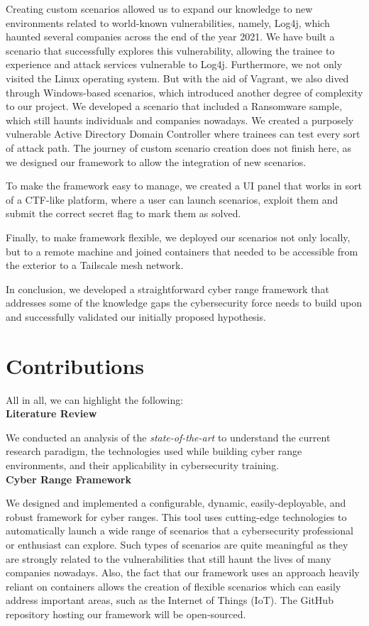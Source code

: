 Creating custom scenarios allowed us to expand our knowledge to new environments related to world-known vulnerabilities, namely, Log4j, which haunted several companies across the end of the year 2021. We have built a scenario that successfully explores this vulnerability, allowing the trainee to experience and attack services vulnerable to Log4j. Furthermore, we not only visited the Linux operating system. But with the aid of Vagrant, we also dived through Windows-based scenarios, which introduced another degree of complexity to our project. We developed a scenario that included a Ransomware sample, which still haunts individuals and companies nowadays. We created a purposely vulnerable Active Directory Domain Controller where trainees can test every sort of attack path. The journey of custom scenario creation does not finish here, as we designed our framework to allow the integration of new scenarios. 

To make the framework easy to manage, we created a UI panel that works in sort of a CTF-like platform, where a user can launch scenarios, exploit them and submit the correct secret flag to mark them as solved. 

Finally, to make framework flexible, we deployed our scenarios not only locally, but to a remote machine and joined containers that needed to be accessible from the exterior to a Tailscale mesh network.

In conclusion, we developed a straightforward cyber range framework that addresses some of the knowledge gaps the cybersecurity force needs to build upon and successfully validated our initially proposed hypothesis. 

\section{Contributions} \label{sec:contributions}

All in all, we can highlight the following:\\

\textbf{Literature Review}

We conducted an analysis of the \textit{state-of-the-art} to understand the current research paradigm, the technologies used while building cyber range environments, and their applicability in cybersecurity training.\\

\textbf{Cyber Range Framework}

We designed and implemented a configurable, dynamic, easily-deployable, and robust framework for cyber ranges. This tool uses cutting-edge technologies to automatically launch a wide range of scenarios that a cybersecurity professional or enthusiast can explore. Such types of scenarios are quite meaningful as they are strongly related to the vulnerabilities that still haunt the lives of many companies nowadays. Also, the fact that our framework uses an approach heavily reliant on containers allows the creation of flexible scenarios which can easily address important areas, such as the Internet of Things (IoT). The GitHub repository hosting our framework will be open-sourced.\\

